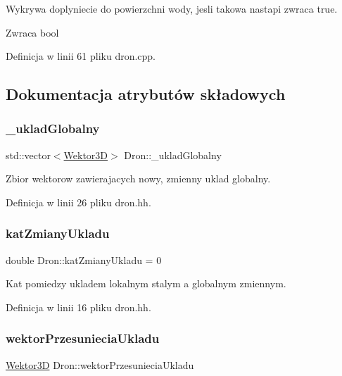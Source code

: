 Wykrywa doplyniecie do powierzchni wody, jesli takowa nastapi zwraca true.

\begin{DoxyReturn}{Zwraca}
bool 
\end{DoxyReturn}


Definicja w linii 61 pliku dron.\+cpp.



\subsection{Dokumentacja atrybutów składowych}
\mbox{\label{class_dron_a43e00887e49cb783f24175d3529ebfaf}} 
\subsubsection{\texorpdfstring{\_ukladGlobalny}{\_ukladGlobalny}}
{\footnotesize\ttfamily std\+::vector$<$\mbox{\hyperlink{class_wektor3_d}{Wektor3D}}$>$ Dron\+::\+\_\+uklad\+Globalny\hspace{0.3cm}{\ttfamily [private]}}

Zbior wektorow zawierajacych nowy, zmienny uklad globalny. 

Definicja w linii 26 pliku dron.\+hh.

\mbox{\label{class_dron_a5308a71851015cd081e5628675a568d0}} 
\subsubsection{\texorpdfstring{katZmianyUkladu}{katZmianyUkladu}}
{\footnotesize\ttfamily double Dron\+::kat\+Zmiany\+Ukladu = 0\hspace{0.3cm}{\ttfamily [private]}}

Kat pomiedzy ukladem lokalnym stalym a globalnym zmiennym. 

Definicja w linii 16 pliku dron.\+hh.

\mbox{\label{class_dron_a02d702b9fcef2ea34dbf0484c1603be5}} 
\subsubsection{\texorpdfstring{wektorPrzesunieciaUkladu}{wektorPrzesunieciaUkladu}}
{\footnotesize\ttfamily \mbox{\hyperlink{class_wektor3_d}{Wektor3D}} Dron\+::wektor\+Przesuniecia\+Ukladu\hspace{0.3cm}{\ttfamily [private]}}

